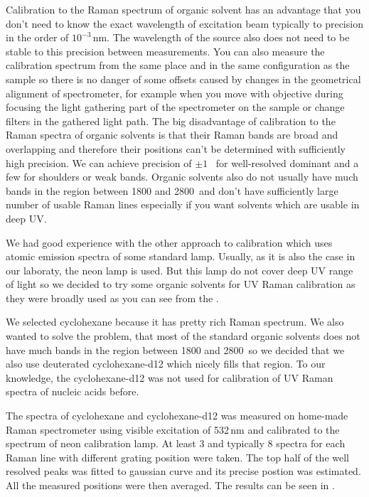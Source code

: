 %

Calibration to the Raman spectrum of organic solvent has an advantage that
you don't need to know the exact wavelength of excitation beam typically to
precision in the order of $10^{-3}$\,nm. The wavelength of the source also
does not need to be stable to this precision between measurements. You can
also measure the calibration spectrum from the same place and in the same
configuration as the sample so there is no danger of some offsets caused by
changes in the geometrical alignment of spectrometer, for example when you
move with objective during focusing the light gathering part of the
spectrometer on the sample or change filters in the gathered light path. The
big disadvantage of calibration to the Raman spectra of organic solvents is
that their Raman bands are broad and overlapping and therefore their
positions can't be determined with sufficiently high precision. We can
achieve precision of $\pm1$ \,\icm{} for well-resolved dominant and a few
\icm{} for shoulders or weak bands. Organic solvents also do not usually have
much bands in the region between 1800 and 2800\,\icm{} and don't have
sufficiently large number of usable Raman lines especially if you want
solvents which are usable in deep UV.

We had good experience with the other approach to calibration which uses
atomic emission spectra of some standard lamp. Usually, as it is also the
case in our laboraty, the neon lamp is used. But this lamp do not cover deep
UV range of light so we decided to try some organic solvents for UV Raman
calibration as they were broadly used as you can see from the
.

We selected cyclohexane because it has pretty rich Raman spectrum. We also
wanted to solve the problem, that most of the standard organic solvents
does not have much bands in the region between 1800 and 2800\,\icm{} so we
decided that we also use deuterated cyclohexane-d12 which nicely fills that
region. To our knowledge, the cyclohexane-d12 was not used for calibration of
UV Raman spectra of nucleic acids before.

The spectra of cyclohexane and cyclohexane-d12 was measured on home-made Raman
spectrometer using visible excitation of 532\,nm
\parencite{Palacky2011}
and calibrated to the spectrum of neon calibration lamp. At least 3 and
typically 8 spectra for each Raman line with different grating position were
taken. The top half of the well resolved peaks was fitted to gaussian
curve and its precise postion was estimated. All the measured positions were
then averaged. The results can be seen in
.

